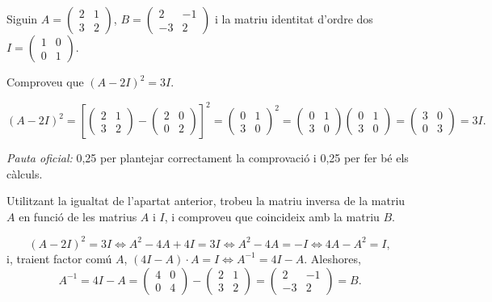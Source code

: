 Siguin $A=\begin{pmatrix}2&1\\3&2\end{pmatrix}$, $B=\begin{pmatrix}2&-1\\-3&2\end{pmatrix}$ i la matriu identitat
d'ordre dos $I=\begin{pmatrix}1&0\\0&1\end{pmatrix}$.

\begin{apartats}

Comproveu que $(A-2I)^2=3I$.

\begin{solucio}
\[
(A-2I)^2=\left[\begin{pmatrix}2&1\\3&2\end{pmatrix}-\begin{pmatrix}2&0\\0&2\end{pmatrix}\right]^2
=\begin{pmatrix}0&1\\3&0\end{pmatrix}^2=\begin{pmatrix}0&1\\3&0\end{pmatrix}\begin{pmatrix}0&1\\3&0\end{pmatrix}
=\begin{pmatrix}3&0\\0&3\end{pmatrix}=3I .
\]

\textit{Pauta oficial:} 0,25 per plantejar correctament la comprovació i 0,25 per fer bé els càlculs.
\end{solucio}

Utilitzant la igualtat de l'apartat anterior, trobeu la matriu inversa de la matriu $A$ en funció de les matrius
$A$ i $I$, i comproveu que coincideix amb la matriu $B$.

\begin{solucio}
\[
(A-2I)^2=3I\iff A^2-4A+4I=3I\iff A^2-4A=-I\iff4A-A^2=I,
\]
i, traient factor comú $A$, $(4I-A)\cdot A=I\iff\boxed{A^{-1}=4I-A}$. Aleshores,
\[
A^{-1}=4I-A=\begin{pmatrix}4&0\\0&4\end{pmatrix}-\begin{pmatrix}2&1\\3&2\end{pmatrix}=\begin{pmatrix}2&-1\\-3&2\end{pmatrix}=B .
\]


\end{solucio}
\end{apartats}
